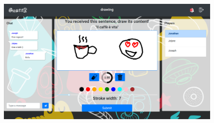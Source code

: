  \begin{figure}[H]
  \centering
  \begin{minipage}[b]{0.75\textwidth}
    \includegraphics[width=\textwidth]{img/screen/draw_1.png}
  \end{minipage}
  \hfill
  \begin{minipage}[b]{0.2\textwidth}

\end{minipage}
\end{figure}
